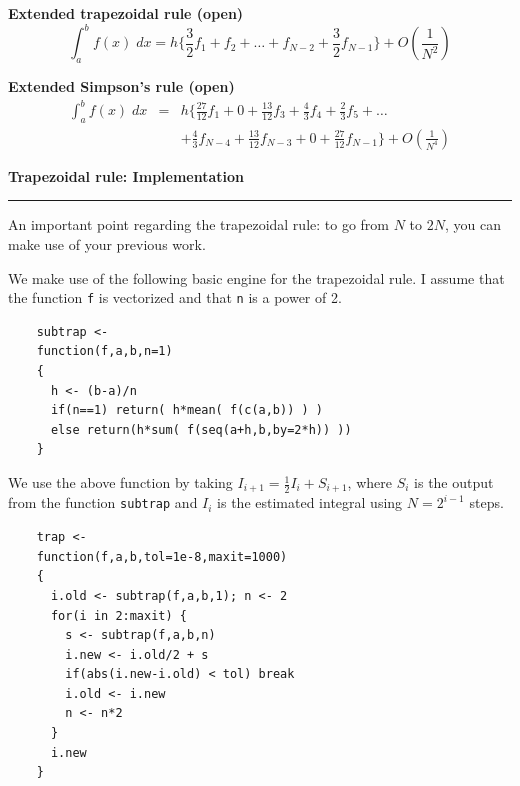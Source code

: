 \documentclass[12pt,letterpaper]{article}
\newcommand{\HRule}{\rule{\linewidth}{4pt}}
\newcommand{\vsphalf}{\vspace*{0.5cm}}
\newcommand{\vsptwo}{\vspace*{2cm}}
\begin{document}
\vsptwo

\textbf{Extended trapezoidal rule (open)}
$$ \int_{a}^{b} f(x) \; dx = h \{ {\textstyle \frac{3}{2}} f_1 + f_2 + \ldots +
f_{N-2} + {\textstyle \frac{3}{2}} f_{N-1} \} + O({\textstyle \frac{1}{N^2}})$$

\bigskip \bigskip

\textbf{Extended Simpson's rule (open)}
\begin{eqnarray*}
\int_{a}^{b} f(x) \; dx & = &h \{ {\textstyle \frac{27}{12}} f_1 + 0 +
  {\textstyle \frac{13}{12}} f_3 + {\textstyle \frac{4}{3}} f_4 +
{\textstyle \frac{2}{3}} f_5 + \ldots \\
& & + {\textstyle \frac{4}{3}} f_{N-4} + {\textstyle \frac{13}{12}}
  f_{N-3} + 0 + {\textstyle \frac{27}{12}} f_{N-1} \} + O({\textstyle \frac{1}{N^4}})
\end{eqnarray*}

\newpage

\fontsize{30}{30} \selectfont

\centerline{\textbf{Trapezoidal rule: Implementation}}

\HRule

\vsphalf

\fontsize{20}{25} \selectfont

An important point regarding the trapezoidal rule: to go from $N$ to
$2N$, you can make use of your previous work.

\bigskip

We make use of the following basic engine for the trapezoidal rule.  I
assume that the function \verb|f| is vectorized and that \verb|n| is a
power of 2.

\fontsize{18}{18} \selectfont

\begin{verbatim}
    subtrap <-
    function(f,a,b,n=1)
    {
      h <- (b-a)/n
      if(n==1) return( h*mean( f(c(a,b)) ) )
      else return(h*sum( f(seq(a+h,b,by=2*h)) ))
    }
\end{verbatim}

\fontsize{20}{25} \selectfont

We use the above function by taking $I_{i+1} = \frac{1}{2} I_i +
S_{i+1}$, where $S_i$ is the output from the function \verb|subtrap|
and $I_i$ is the estimated integral using $N = 2^{i-1}$ steps.

\fontsize{18}{18} \selectfont

\begin{verbatim}
    trap <-
    function(f,a,b,tol=1e-8,maxit=1000)
    {
      i.old <- subtrap(f,a,b,1); n <- 2
      for(i in 2:maxit) {
        s <- subtrap(f,a,b,n)
        i.new <- i.old/2 + s
        if(abs(i.new-i.old) < tol) break
        i.old <- i.new
        n <- n*2
      }
      i.new
    }
\end{verbatim}
\end{document}
